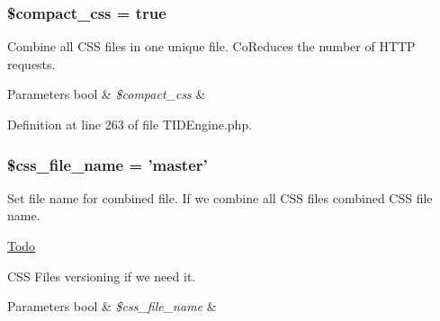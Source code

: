 \hypertarget{group__css__cache__settings_gad7ca051062e3dc2de4fa237217abef86}{
\subsubsection[{\$compact\_\-css}]{\setlength{\rightskip}{0pt plus 5cm}\$compact\_\-css = true}}
\label{group__css__cache__settings_gad7ca051062e3dc2de4fa237217abef86}
Combine all CSS files in one unique file. CoReduces the number of HTTP requests.


\begin{DoxyParams}[1]{Parameters}
bool & {\em \$compact\_\-css} & \\
\hline
\end{DoxyParams}


Definition at line 263 of file TIDEngine.php.

\hypertarget{group__css__cache__settings_ga2864dee7a65933d1d4c94373d542b700}{
\subsubsection[{\$css\_\-file\_\-name}]{\setlength{\rightskip}{0pt plus 5cm}\$css\_\-file\_\-name = 'master'}}
\label{group__css__cache__settings_ga2864dee7a65933d1d4c94373d542b700}
Set file name for combined file. If we combine all CSS files combined CSS file name.

\begin{Desc}
\item[\hyperlink{todo__todo000002}{Todo}]
\begin{DoxyItemize}
\item CSS Files versioning if we need it. 
\end{DoxyItemize}\end{Desc}

\begin{DoxyParams}[1]{Parameters}
bool & {\em \$css\_\-file\_\-name} & \\
\hline
\end{DoxyParams}


